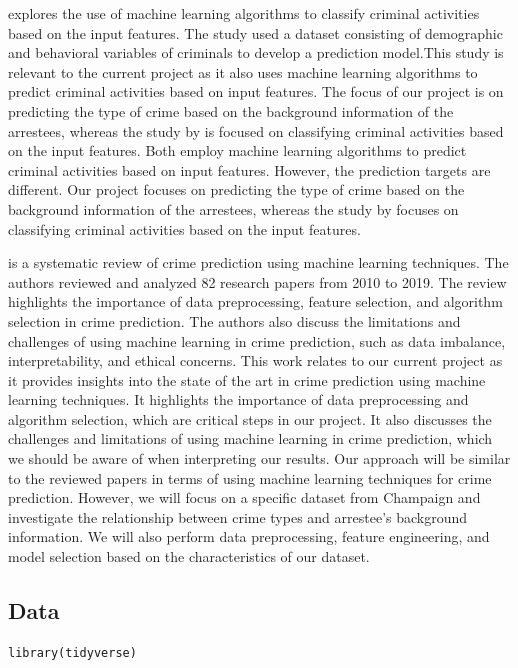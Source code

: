 \documentclass[
  article]{jss}
\begin{document}
\citet{Saeed2015} explores the use of machine learning algorithms to
classify criminal activities based on the input features. The study used
a dataset consisting of demographic and behavioral variables of
criminals to develop a prediction model.This study is relevant to the
current project as it also uses machine learning algorithms to predict
criminal activities based on input features. The focus of our project is
on predicting the type of crime based on the background information of
the arrestees, whereas the study by \citet{Saeed2015} is focused on
classifying criminal activities based on the input features. Both employ
machine learning algorithms to predict criminal activities based on
input features. However, the prediction targets are different. Our
project focuses on predicting the type of crime based on the background
information of the arrestees, whereas the study by \citet{Saeed2015}
focuses on classifying criminal activities based on the input features.

\citet{Mandalapu2023} is a systematic review of crime prediction using
machine learning techniques. The authors reviewed and analyzed 82
research papers from 2010 to 2019. The review highlights the importance
of data preprocessing, feature selection, and algorithm selection in
crime prediction. The authors also discuss the limitations and
challenges of using machine learning in crime prediction, such as data
imbalance, interpretability, and ethical concerns. This work relates to
our current project as it provides insights into the state of the art in
crime prediction using machine learning techniques. It highlights the
importance of data preprocessing and algorithm selection, which are
critical steps in our project. It also discusses the challenges and
limitations of using machine learning in crime prediction, which we
should be aware of when interpreting our results. Our approach will be
similar to the reviewed papers in terms of using machine learning
techniques for crime prediction. However, we will focus on a specific
dataset from Champaign and investigate the relationship between crime
types and arrestee's background information. We will also perform data
preprocessing, feature engineering, and model selection based on the
characteristics of our dataset.

\hypertarget{data}{%
\subsection{Data}\label{data}}

\begin{verbatim}
library(tidyverse)
\end{verbatim}
\end{document}
